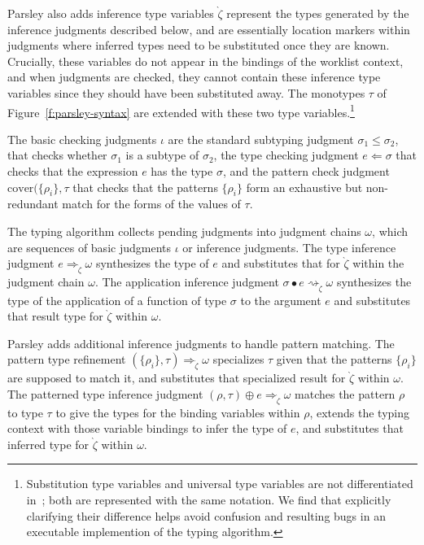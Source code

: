 \documentclass[letterpaper]{article}
\newcommand{\stv}{{\grave{\zeta}}}    %
\begin{document}
Parsley also adds inference type variables $\stv$ represent the types
generated by the inference judgments described below, and are
essentially location markers within judgments where inferred types
need to be substituted once they are known.  Crucially, these
variables do not appear in the bindings of the worklist context, and
when judgments are checked, they cannot contain these inference type
variables since they should have been substituted away.  The monotypes
$\tau$ of Figure~\ref{f:parsley-syntax} are extended with these two
type variables.\footnote{Substitution type variables and universal
  type variables are not differentiated
  in~\cite{zhao2018,zhao19:bidir}; both are represented with the same
  notation.  We find that explicitly clarifying their difference helps
  avoid confusion and resulting bugs in an executable implemention of
  the typing algorithm.}

The basic checking judgments $\iota$ are the standard subtyping
judgment $\sigma_1\leq\sigma_2$, that checks whether $\sigma_1$ is a
subtype of $\sigma_2$, the type checking judgment $e\Leftarrow\sigma$
that checks that the expression $e$ has the type $\sigma$, and the
pattern check judgment $\mathrm{cover}(\{\rho_i\},\tau$ that checks
that the patterns $\{\rho_i\}$ form an exhaustive but non-redundant
match for the forms of the values of $\tau$.

The typing algorithm collects pending judgments into judgment chains
$\omega$, which are sequences of basic judgments $\iota$ or inference
judgments.  The type inference judgment $e\Rightarrow_\stv\omega$
synthesizes the type of $e$ and substitutes that for $\stv$ within the
judgment chain $\omega$.  The application inference judgment
$\sigma\bullet e\rightsquigarrow_\stv\omega$ synthesizes the type of
the application of a function of type $\sigma$ to the argument $e$ and
substitutes that result type for $\stv$ within $\omega$.

Parsley adds additional inference judgments to handle pattern
matching.  The pattern type refinement
$(\{\rho_i\},\tau)\Rightarrow_\stv\omega$ specializes $\tau$ given
that the patterns $\{\rho_i\}$ are supposed to match it, and
substitutes that specialized result for $\stv$ within $\omega$.  The
patterned type inference judgment $(\rho,\tau)\oplus e\Rightarrow_\stv\omega$
matches the pattern $\rho$ to type $\tau$ to
give the types for the binding variables within $\rho$, extends the
typing context with those variable bindings to infer the type of $e$,
and substitutes that inferred type for $\stv$ within $\omega$.
\end{document}
